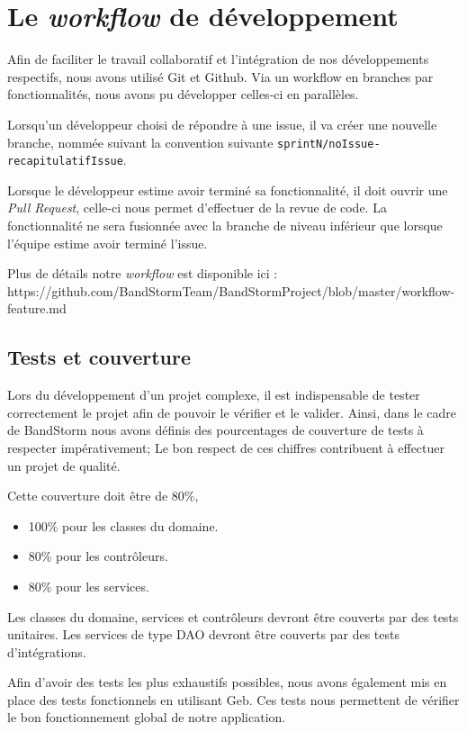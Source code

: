 \documentclass[12pt,a4paper,oneside]{book}
\begin{document}
	\chapter{Le \textit{workflow} de développement}
	Afin de faciliter le travail collaboratif et l’intégration de nos développements respectifs, nous avons utilisé Git et Github. 
	Via un workflow en branches par fonctionnalités, nous avons pu développer celles-ci en parallèles. 
	
	Lorsqu'un développeur choisi de répondre à une issue, il va créer une nouvelle branche, nommée suivant la convention suivante
	\texttt{sprintN/noIssue-recapitulatifIssue}.
	
	Lorsque le développeur estime avoir terminé sa fonctionnalité, il doit ouvrir une \textit{Pull Request}, celle-ci nous permet d’effectuer de la revue de code. La fonctionnalité ne sera fusionnée avec la branche de niveau inférieur que lorsque l'équipe estime avoir terminé l’issue.
	
	Plus de détails notre \textit{workflow} est disponible ici : 
	https://github.com/BandStormTeam/BandStormProject/blob/master/workflow-feature.md
	
	\section{Tests et couverture}
	Lors du développement d’un projet complexe, il est indispensable de tester correctement le projet afin de pouvoir le vérifier et le valider. Ainsi, dans le cadre de BandStorm nous avons définis des pourcentages de couverture de tests à respecter impérativement; Le bon respect de ces chiffres contribuent à effectuer un projet de qualité. 
	
	Cette couverture doit être de 80\%, 
	\begin{itemize}
		\item 100\% pour les classes du domaine.
		\item 80\% pour les contrôleurs.
		\item 80\% pour les services.
	\end{itemize}	
	
	Les classes du domaine, services et contrôleurs devront être couverts par des tests unitaires. Les services de type DAO devront être couverts par des tests d’intégrations.
	
	Afin d’avoir des tests les plus exhaustifs possibles, nous avons également mis en place des tests fonctionnels en utilisant Geb. Ces tests nous permettent de vérifier le bon fonctionnement global de notre application.
	
\end{document}
